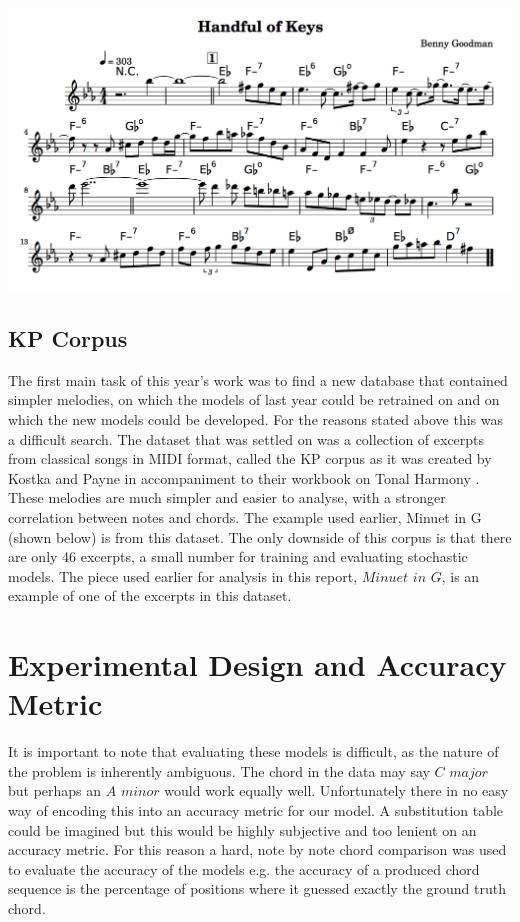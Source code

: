 \documentclass[bsc,singlespacing,logo, parskip, deptreport]{infthesis}
\begin{document}
\includegraphics[scale=0.5]{benny}

\subsection{KP Corpus} \label{kp}
The first main task of this year's work was to find a new database that contained simpler melodies, on which the models of last year could be retrained on and on which the new models could be developed. For the reasons stated above this was a difficult search. The dataset that was settled on was a collection of excerpts from classical songs in MIDI format, called the KP corpus as it was created by Kostka and Payne in accompaniment to their workbook on Tonal Harmony \cite{kostka2009tonal}. These melodies are much simpler and easier to analyse, with a stronger correlation between notes and chords. The example used earlier, Minuet in G (shown below) is from this dataset. The only downside of this corpus is that there are only 46 excerpts, a small number for training and evaluating stochastic models. The piece used earlier for analysis in this report, $Minuet$ $in$ $G$, is an example of one of the excerpts in this dataset.

\section{Experimental Design and Accuracy Metric}

It is important to note that evaluating these models is difficult, as the nature of the problem is inherently ambiguous. The chord in the data may say $C$ $major$ but perhaps an $A$ $minor$ would work equally well. Unfortunately there in no easy way of encoding this into an accuracy metric for our model. A substitution table could be imagined but this would be highly subjective and too lenient on an accuracy metric. For this reason a hard, note by note chord comparison was used to evaluate the accuracy of the models e.g. the accuracy of a produced chord sequence is the percentage of positions where it guessed exactly the ground truth chord.
\end{document}

